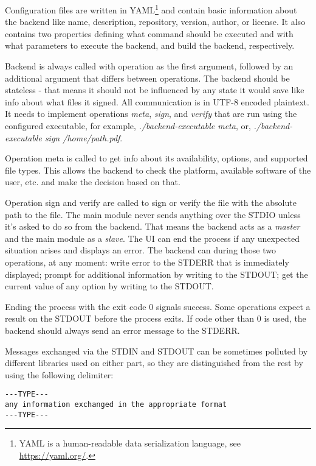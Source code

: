\documentclass[thesismargins, english, thesislinespacing, onelinechapterstyle, upjsfrontpage]{rnthesis}
\begin{document}
Configuration files are written in YAML\footnote{YAML is a human-readable data serialization language, see \url{https://yaml.org/}.} and contain basic information about the backend like name, description, repository, version, author, or license.
It also contains two properties defining what command should be executed and with what parameters to execute the backend, and build the backend, respectively.

Backend is always called with operation as the first argument, followed by an additional argument that differs between operations.
The backend should be stateless - that means it should not be influenced by any state it would save like info about what files it signed.
All communication is in UTF-8 encoded plaintext.
It needs to implement operations \textit{meta}, \textit{sign}, and \textit{verify} that are run using the configured executable, for example, \textit{./backend-executable meta}, or, \textit{./backend-executable sign /home/path.pdf}.

Operation meta is called to get info about its availability, options, and supported file types.
This allows the backend to check the platform, available software of the user, etc. and make the decision based on that.

Operation sign and verify are called to sign or verify the file with the absolute path to the file.
The main module never sends anything over the STDIO unless it's asked to do so from the backend.
That means the backend acts as a \textit{master} and the main module as a \textit{slave}.
The UI can end the process if any unexpected situation arises and displays an error.
The backend can during those two operations, at any moment: write error to the STDERR that is immediately displayed; prompt for additional information by writing to the STDOUT; get the current value of any option by writing to the STDOUT.

Ending the process with the exit code 0 signals success.
Some operations expect a result on the STDOUT before the process exits.
If code other than 0 is used, the backend should always send an error message to the STDERR.

Messages exchanged via the STDIN and STDOUT can be sometimes polluted by different libraries used on either part, so they are distinguished from the rest by using the following delimiter:

\begin{verbatim}
---TYPE---
any information exchanged in the appropriate format
---TYPE---
\end{verbatim}
\end{document}
